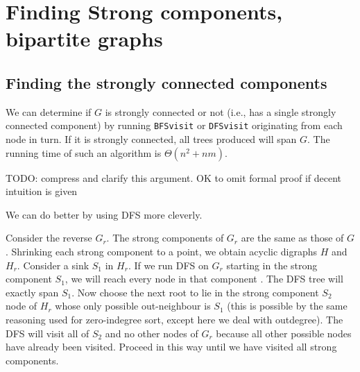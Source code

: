 \chapter{Finding Strong components, bipartite graphs} %

\section{Finding the strongly connected components}




We can determine if $G$ is strongly connected or not (i.e., has a single strongly connected component) 
by running \texttt{BFSvisit} or \texttt{DFSvisit} originating from each node in turn. 
If it is strongly connected, all trees produced will span $G$. 
The running time of such an algorithm is $\Theta(n^2+nm)$.

{\color{red} TODO: compress and clarify this argument. OK to omit formal proof if decent intuition is given}

We can do better by using DFS more cleverly. 

Consider the reverse $G_r$. The strong components of $G_r$ are the
same as those of $G$. Shrinking each strong component to a point,
we obtain  acyclic digraphs $H$ and $H_r$. Consider a sink $S_1$ in
$H_r$. If we run DFS on $G_r$ starting  in the strong component
$S_1$, we will reach every node in that component . The DFS tree will exactly span $S_1$. Now
choose the next root to lie in the strong component $S_2$ node of
$H_r$ whose only possible out-neighbour is $S_1$ (this is possible
by the same reasoning used for zero-indegree sort, except here we
deal with outdegree). The DFS will visit all of $S_2$ and no other
nodes of $G_r$ because all other possible nodes have already been
visited. Proceed in this way until we have visited all strong
components.

